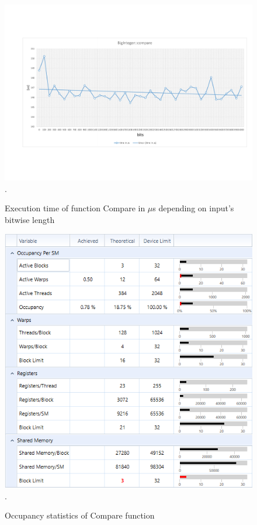 \documentclass[oneside,openright,12pt,final,en]{mgr}
\begin{document}
\begin{figure}[H]
	\centering
	\includegraphics[width=\textwidth,trim={0 2.5cm 0 2.5cm},clip]{compare.pdf}.
	\caption{Execution time of function Compare in $\mu$s depending on input's bitwise length}
	\label{fig:compare}
\end{figure}

\begin{figure}[H]
	\centering
	\includegraphics[width=\textwidth]{compare_occupancy}.
	\caption{Occupancy statistics of Compare function}
	\label{fig:compare_occupancy}
\end{figure}
\end{document}
